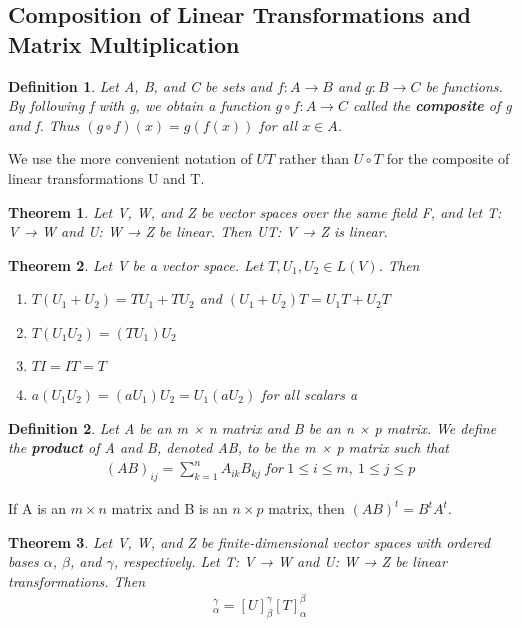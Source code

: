 \documentclass{article}
\newcommand{\bd}[1]{\textbf{#1}}
\theoremstyle{plain}
\newtheorem{theorem}{Theorem}[section]
\newtheorem*{definition1}{Definition}
\theoremstyle{plain} %
\begin{document}
\subsection {Composition of Linear Transformations and Matrix Multiplication}

\begin{definition1}
Let A, B, and C be sets and $f : A \to B$ and $g : B \to C$ be functions. By following f with g, we obtain a function $g \circ f : A → C$ called the \bd{composite} of g and f. Thus $(g \circ f)(x) = g(f(x))$ for all $x \in A$. 
\end{definition1}

We use the more convenient notation of $UT$ rather than $U \circ T$ for the composite of linear transformations U and T.

\begin{theorem}
Let V, W, and Z be vector spaces over the same field F, and let T: V → W and U: W → Z be linear. Then UT: V → Z is linear.
\end{theorem}

\begin{theorem}
Let V be a vector space. Let $T,U_1,U_2 \in L(V)$. Then
\begin{enumerate}[label=(\alph*)]
\item $T(U_1 + U_2) = TU_1 + TU_2$ and $(U_1 + U_2)T = U_1T + U_2T$
\item $T(U_1U_2)=(TU_1)U_2$
\item $TI = IT = T$
\item $a(U_1U_2)=(aU_1)U_2 = U_1(aU_2)$ for all scalars a
\end{enumerate}
\end{theorem}

\begin{definition1}
Let A be an m × n matrix and B be an n × p matrix. We define the \bd{product} of A and B, denoted AB, to be the m × p matrix such
that
\begin{align*}
(AB)_{ij}=\sum_{k=1}^n A_{ik}B_{kj}~for~1\leq i\leq m, ~1\leq j\leq p
\end{align*}
\end{definition1}

If A is an $m\times n$ matrix and B is an $n\times p$ matrix, then $(AB)^t = B^tA^t$.


\begin{theorem}
Let V, W, and Z be finite-dimensional vector spaces with ordered bases $\alpha$, $\beta$, and $\gamma$, respectively. Let T: V → W and U: W → Z be linear transformations. Then
\begin{align*}
[UT]_\alpha^\gamma=[U]_\beta^\gamma[T]_\alpha^\beta
\end{align*}
\end{theorem}
\end{document}
